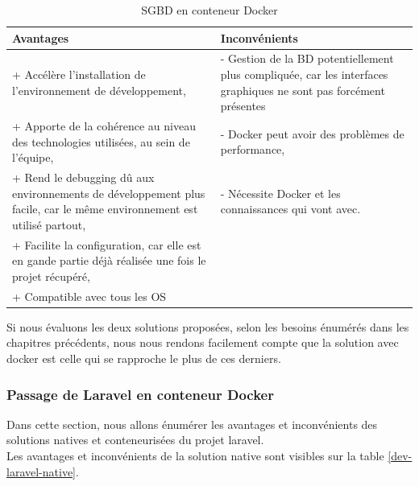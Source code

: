 \documentclass[
    iai, %
    il, %
]{heig-tb}
\begin{document}
\begin{table}[h]
    \begin{center}
        \caption{SGBD en conteneur Docker \label{dev-sgbd-docker}}
        \begin{tabularx}{1.0\textwidth} {X|X}
            Avantages                             & Inconvénients                                                           \\ \hline
            + Accélère l'installation de l'environnement de développement,
            \cite{labrecque,data-flair-pros-cons} & - Gestion de la BD
            potentiellement plus compliquée, car les interfaces graphiques ne sont pas forcément présentes                  \\
            + Apporte de la cohérence au niveau des technologies utilisées, au sein de l'équipe,
            \cite{labrecque,data-flair-use-cases} & - Docker peut avoir des problèmes de performance,
            \cite{labrecque}                                                                                                \\
            + Rend le debugging dû aux environnements de développement plus facile, car le même environnement est utilisé partout,
            \cite{labrecque,koukia}               & - Nécessite Docker et les connaissances qui vont avec. \cite{labrecque} \\
            + Facilite la configuration, car elle est en gande partie déjà réalisée une fois le projet récupéré,
            \cite{data-flair-pros-cons}           &                                                                         \\
            + Compatible avec tous les OS         &                                                                         \\
        \end{tabularx}
    \end{center}
\end{table}

Si nous évaluons les deux solutions proposées, selon les besoins énumérés dans les chapitres précédents, nous nous rendons facilement compte que la solution avec \Gls{docker} est celle qui se rapproche le plus de ces derniers.

\subsubsection{Passage de Laravel en conteneur Docker}
Dans cette section, nous allons énumérer les avantages et inconvénients des solutions natives et conteneurisées du projet \Gls{laravel}. \\
Les avantages et inconvénients de la solution native sont visibles sur la table \ref{dev-laravel-native}.
\end{document}
